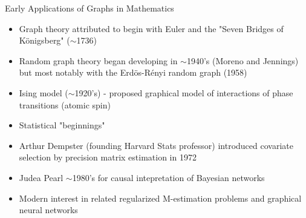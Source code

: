\documentclass{beamer}
\begin{document}

\begin{frame}{Early Applications of Graphs in Mathematics}
\begin{itemize}
    \item Graph theory attributed to begin with Euler and the "Seven Bridges of K\"onigsberg" ($\sim$1736)
    \item Random graph theory began developing in $\sim$1940's (Moreno and Jennings) but most notably with the Erd\"os-R\'enyi random graph (1958)
    \item Ising model ($\sim$1920's) - proposed graphical model of interactions of phase transitions (atomic spin)
    \item Statistical "beginnings"%
    \item Arthur Dempster (founding Harvard Stats professor) introduced covariate selection by precision matrix estimation in 1972 \cite{dempster_covariance_1972}
    \item Judea Pearl $\sim$1980's for causal intepretation of Bayesian networks
    \item Modern interest in related regularized M-estimation problems and graphical neural networks 
\end{itemize}
\end{frame}
\end{document}
